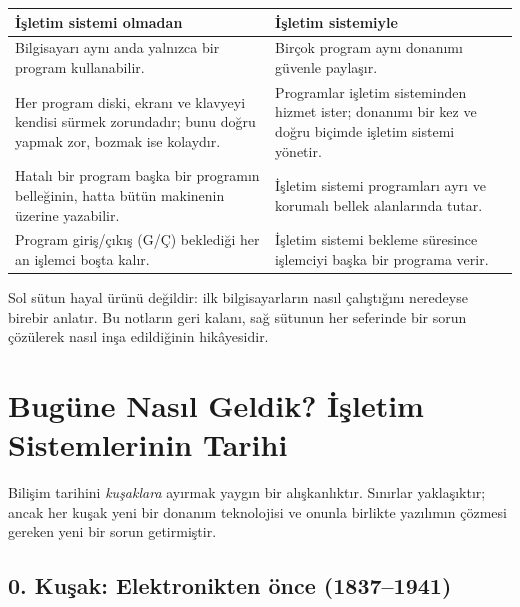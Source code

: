 \documentclass[11pt,a4paper]{article}
\begin{document}
\begin{center}
\renewcommand{\arraystretch}{1.35}
\begin{tabularx}{\linewidth}{>{\raggedright\arraybackslash}X >{\raggedright\arraybackslash}X}
\toprule
\textbf{\color{red!60!black}İşletim sistemi olmadan} & \textbf{\color{mintdeep}İşletim sistemiyle} \\
\midrule
Bilgisayarı aynı anda yalnızca bir program kullanabilir. & Birçok program aynı donanımı güvenle paylaşır. \\
Her program diski, ekranı ve klavyeyi kendisi sürmek zorundadır; bunu doğru yapmak zor, bozmak ise kolaydır. & Programlar işletim sisteminden hizmet ister; donanımı bir kez ve doğru biçimde işletim sistemi yönetir. \\
Hatalı bir program başka bir programın belleğinin, hatta bütün makinenin üzerine yazabilir. & İşletim sistemi programları ayrı ve korumalı bellek alanlarında tutar. \\
Program giriş/çıkış (G/Ç) beklediği her an işlemci boşta kalır. & İşletim sistemi bekleme süresince işlemciyi başka bir programa verir. \\
\bottomrule
\end{tabularx}
\end{center}

Sol sütun hayal ürünü değildir: ilk bilgisayarların nasıl çalıştığını neredeyse birebir anlatır. Bu notların geri kalanı, sağ sütunun her seferinde bir sorun çözülerek nasıl inşa edildiğinin hikâyesidir.

\section{Bugüne Nasıl Geldik? İşletim Sistemlerinin Tarihi}

Bilişim tarihini \emph{kuşaklara} ayırmak yaygın bir alışkanlıktır. Sınırlar yaklaşıktır; ancak her kuşak yeni bir donanım teknolojisi ve onunla birlikte yazılımın çözmesi gereken yeni bir sorun getirmiştir.

\subsection{0. Kuşak: Elektronikten önce (1837--1941)}
\end{document}
